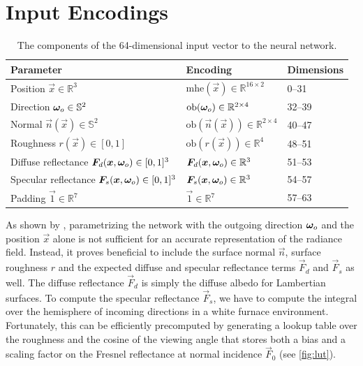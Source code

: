 \section{Input Encodings}
\begin{table}[htb!]
    \centering
    \begin{tabular}{l l l}
        \textbf{Parameter} & \textbf{Encoding} & \textbf{Dimensions} \\
        \midrule
        Position $\vec{x} \in \mathbb{R}^3$ & $\mathrm{mhe}(\vec{x}) \in \mathbb{R}^{16 \times 2}$ & 0--31 \\
        Direction ${\bm{\omega}_o} \in \mathbb{S}^2$ & $\mathrm{ob}({\bm{\omega}_o}) \in \mathbb{R}^{2 \times 4}$ & 32--39 \\
        Normal $\vec{n}(\vec{x}) \in \mathbb{S}^2$ & $\mathrm{ob}(\vec{n}(\vec{x})) \in \mathbb{R}^{2 \times 4}$ & 40--47 \\
        Roughness $r(\vec{x}) \in [0,1]$ & $\mathrm{ob}(r(\vec{x})) \in \mathbb{R}^{4}$ & 48--51 \\
        Diffuse reflectance $\bm{F}_d(\bm{x}, {\bm{\omega}_o}) \in [0,1]^3$ & $\bm{F}_d(\bm{x}, {\bm{\omega}_o}) \in \mathbb{R}^{3}$ & 51--53 \\
        Specular reflectance $\bm{F}_s(\bm{x}, {\bm{\omega}_o}) \in [0,1]^3$ & $\bm{F}_s(\bm{x}, {\bm{\omega}_o}) \in \mathbb{R}^{3}$ & 54--57 \\
        Padding $\vec{1} \in \mathbb{R}^7$ & $\vec{1} \in \mathbb{R}^7$ & 57--63 \\ %
    \end{tabular}
    \caption{The components of the 64-dimensional input vector to the neural network.}
    \label{tab:input-encoding}
\end{table}
As shown by \textcite{ren2013}, parametrizing the network with the outgoing direction ${\bm{\omega}_o}$ and the position $\vec{x}$ alone is not sufficient for an accurate representation of the radiance field.
Instead, it proves beneficial to include the surface normal $\vec{n}$, surface roughness $r$ and the expected diffuse and specular reflectance terms $\vec{F}_d$ and $\vec{F}_s$ as well.
The diffuse reflectance $\vec{F}_d$ is simply the diffuse albedo for Lambertian surfaces.
To compute the specular reflectance $\vec{F}_s$, we have to compute the integral over the hemisphere of incoming directions in a white furnace environment.
Fortunately, this can be efficiently precomputed by generating a lookup table over the roughness and the cosine of the viewing angle that stores both a bias and a scaling factor on the Fresnel reflectance at normal incidence $\vec{F}_0$ (see \cref{fig:lut}).
